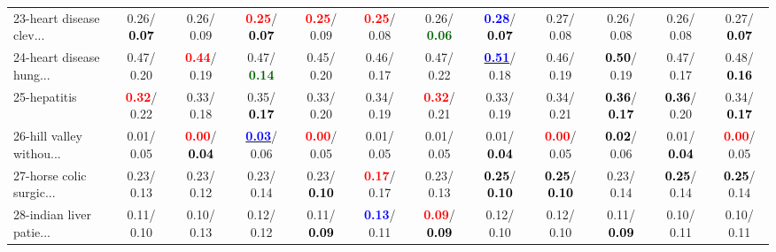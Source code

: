 \begin{table}[h]
\begin{center}
{\begin{tabular}{lc|c|c|c|c|c|c|c|c|c|c}
23-heart disease clev... &   0.26/\textcolor{black}{\textbf{  0.07}} &   0.26/  0.09 & \textcolor{red}{\textbf{  0.25}}/\textcolor{black}{\textbf{  0.07}} & \textcolor{red}{\textbf{  0.25}}/  0.09 & \textcolor{red}{\textbf{  0.25}}/  0.08 &   0.26/\textcolor{darkgreen}{\textbf{  0.06}} & \textcolor{blue}{\textbf{  0.28}}/\textcolor{black}{\textbf{  0.07}} &   0.27/  0.08 &   0.26/  0.08 &   0.26/  0.08 &   0.27/\textcolor{black}{\textbf{  0.07}} \\
24-heart disease hung... &   0.47/  0.20 & \textcolor{red}{\textbf{  0.44}}/  0.19 &   0.47/\textcolor{darkgreen}{\textbf{  0.14}} &   0.45/  0.20 &   0.46/  0.17 &   0.47/  0.22 & \underline{\textcolor{blue}{\textbf{  0.51}}}/  0.18 &   0.46/  0.19 & \textcolor{black}{\textbf{  0.50}}/  0.19 &   0.47/  0.17 &   0.48/\textcolor{black}{\textbf{  0.16}} \\
25-hepatitis & \textcolor{red}{\textbf{  0.32}}/  0.22 &   0.33/  0.18 &   0.35/\textcolor{black}{\textbf{  0.17}} &   0.33/  0.20 &   0.34/  0.19 & \textcolor{red}{\textbf{  0.32}}/  0.21 &   0.33/  0.19 &   0.34/  0.21 & \textcolor{black}{\textbf{  0.36}}/\textcolor{black}{\textbf{  0.17}} & \textcolor{black}{\textbf{  0.36}}/  0.20 &   0.34/\textcolor{black}{\textbf{  0.17}} \\
26-hill valley withou... &   0.01/  0.05 & \textcolor{red}{\textbf{  0.00}}/\textcolor{black}{\textbf{  0.04}} & \underline{\textcolor{blue}{\textbf{  0.03}}}/  0.06 & \textcolor{red}{\textbf{  0.00}}/  0.05 &   0.01/  0.05 &   0.01/  0.05 &   0.01/\textcolor{black}{\textbf{  0.04}} & \textcolor{red}{\textbf{  0.00}}/  0.05 & \textcolor{black}{\textbf{  0.02}}/  0.06 &   0.01/\textcolor{black}{\textbf{  0.04}} & \textcolor{red}{\textbf{  0.00}}/  0.05 \\
27-horse colic surgic... &   0.23/  0.13 &   0.23/  0.12 &   0.23/  0.14 &   0.23/\textcolor{black}{\textbf{  0.10}} & \textcolor{red}{\textbf{  0.17}}/  0.17 &   0.23/  0.13 & \textcolor{black}{\textbf{  0.25}}/\textcolor{black}{\textbf{  0.10}} & \textcolor{black}{\textbf{  0.25}}/\textcolor{black}{\textbf{  0.10}} &   0.23/  0.14 & \textcolor{black}{\textbf{  0.25}}/  0.14 & \textcolor{black}{\textbf{  0.25}}/  0.14 \\
28-indian liver patie... &   0.11/  0.10 &   0.10/  0.13 &   0.12/  0.12 &   0.11/\textcolor{black}{\textbf{  0.09}} & \textcolor{blue}{\textbf{  0.13}}/  0.11 & \textcolor{red}{\textbf{  0.09}}/\textcolor{black}{\textbf{  0.09}} &   0.12/  0.10 &   0.12/  0.10 &   0.11/\textcolor{black}{\textbf{  0.09}} &   0.10/  0.11 &   0.10/  0.11 \\ \hline

\end{tabular}}
\end{center}
\end{table}
